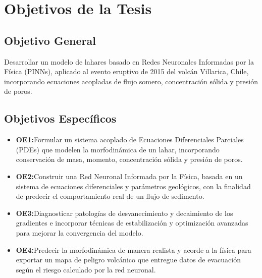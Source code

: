 \documentclass[11pt]{article}
\begin{document}
\onehalfspacing %

\section{Objetivos de la Tesis}
\subsection{Objetivo General}
Desarrollar un modelo de lahares basado en Redes Neuronales Informadas por la Física (PINNs), aplicado al evento eruptivo de 2015 del volcán Villarica, Chile, incorporando ecuaciones acopladas de flujo somero, concentración sólida y presión de poros.
\subsection{Objetivos Específicos}
\begin{itemize}
    \item \textbf{OE1:}Formular un sistema acoplado de Ecuaciones Diferenciales Parciales (PDEs) que modelen la morfodinámica de un lahar, incorporando conservación de masa, momento, concentración sólida y presión de poros.
    \item \textbf{OE2:}Construir una Red Neuronal Informada por la Física, basada en un sistema de ecuaciones diferenciales y parámetros geológicos, con la finalidad de predecir el comportamiento real de un flujo de sedimento. 
    \item \textbf{OE3:}Diagnosticar patologías de desvanecimiento y decaimiento de los gradientes e incorporar técnicas de estabilización y optimización avanzadas para mejorar la convergencia del modelo.
    \item \textbf{OE4:}Predecir la morfodinámica de manera realista y acorde a la física para exportar un mapa de peligro volcánico que entregue datos de evacuación según el riesgo calculado por la red neuronal.   
\end{itemize}

\newpage
\end{document}
